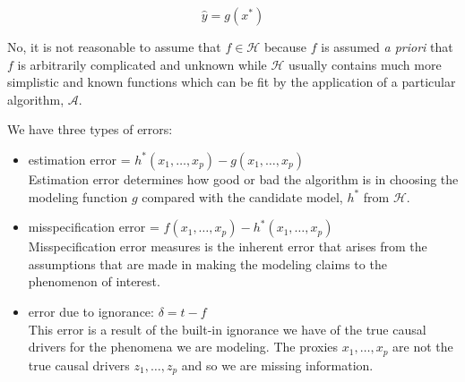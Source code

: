\documentclass[12pt]{article}
\begin{document}
\begin{enumerate}
\begin{tcolorbox}[colback=white, sharp corners]
\[
	\hat{y} = g(x^{*})
\]

\end{tcolorbox}


\begin{tcolorbox}[colback=white, sharp corners]

No, it is not reasonable to assume that $f \in \mathcal{H}$ because $f$ is assumed \emph{a priori} that $f$ is arbitrarily complicated and unknown while $\mathcal{H}$ usually contains much more simplistic and known functions which can be fit by the application of a particular algorithm, $\mathcal{A}$. 

\end{tcolorbox}


\begin{tcolorbox}[colback=white, sharp corners]

We have three types of errors:

\begin{itemize}
	\item[1.] estimation error = $h^{*}(x_1, \ldots, x_p) - g(x_1, \ldots, x_p)$\\
	Estimation error determines how good or bad the algorithm is in choosing the modeling function $g$ compared with the candidate model, $h^{*}$ from $\mathcal{H}$.
	\item[2.] misspecification error = $f(x_1, \ldots, x_p) - h^{*}(x_1, \ldots, x_p)$\\
	Misspecification error measures is the inherent error that arises from the assumptions that are made in making the modeling claims to the phenomenon of interest.
	\item[3.] error due to ignorance: $\delta = t - f$\\
	This error is a result of the built-in ignorance we have of the true causal drivers for the phenomena we are modeling. The proxies $x_1, \ldots, x_p$ are not the true causal drivers $z_1, \ldots, z_p$ and so we are missing information. 
\end{itemize}


\end{tcolorbox}
\end{enumerate}
\end{document}
